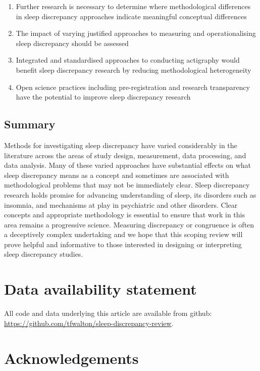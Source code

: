 \documentclass[
]{article}
\providecommand{\tightlist}{%
  \setlength{\itemsep}{0pt}\setlength{\parskip}{0pt}}
\begin{document}
\begin{enumerate}
\def\labelenumi{\arabic{enumi}.}
\tightlist
\item
  Further research is necessary to determine where methodological differences in sleep discrepancy approaches indicate meaningful conceptual differences
\item
  The impact of varying justified approaches to measuring and operationalising sleep discrepancy should be assessed
\item
  Integrated and standardised approaches to conducting actigraphy would benefit sleep discrepancy research by reducing methodological heterogeneity
\item
  Open science practices including pre-registration and research transparency have the potential to improve sleep discrepancy research
\end{enumerate}

\subsection{Summary}\label{item21}

Methods for investigating sleep discrepancy have varied considerably in the literature across the areas of study design, measurement, data processing, and data analysis. Many of these varied approaches have substantial effects on what sleep discrepancy means as a concept and sometimes are associated with methodological problems that may not be immediately clear. Sleep discrepancy research holds promise for advancing understanding of sleep, its disorders such as insomnia, and mechanisms at play in psychiatric and other disorders. Clear concepts and appropriate methodology is essential to ensure that work in this area remains a progressive science. Measuring discrepancy or congruence is often a deceptively complex undertaking and we hope that this scoping review will prove helpful and informative to those interested in designing or interpreting sleep discrepancy studies.

\section{Data availability statement}\label{data-availability-statement}

All code and data underlying this article are available from github: \url{https://github.com/tfwalton/sleep-discrepancy-review}.

\section{Acknowledgements}\label{acknowledgements}
\end{document}
